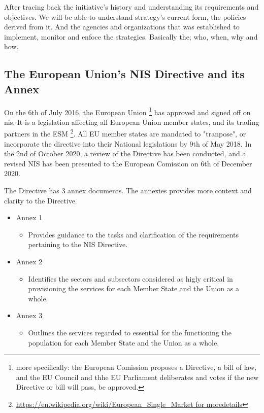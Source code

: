 After tracing back the initiative's history and understanding its requirements and objectives. We will be able to understand strategy's current form, the policies derived from it. And the agencies and organizations that was established to implement, monitor and enfoce the strategies. Basically the; who, when, why and how.

\subsection{The European Union's NIS Directive and its Annex}

On the 6th of July 2016, the European Union \footnote[2]{more specifically: the European Comission proposes a Directive, a bill of law, and the EU Council and thhe EU Parliament deliberates and votes if the new Directive or bill will pass, be approved.} has approved and signed off on \acrfull{nis}. It is a legislation affecting all European Union member states, and its trading partners in the \Gls{ESM} \footnote[2]{\url{https://en.wikipedia.org/wiki/European_Single_Market for moredetails}}. All EU member states are mandated to "tranpose", or incorporate the directive into their National legislations by 9th of May 2018. In the 2nd of October 2020, a review of the Directive has been conducted, and a revised NIS has been presented to the European Comission on 6th of December 2020.

The Directive has 3 annex documents. The annexies provides more context and clarity to the Directive.

\begin{itemize}
    \item Annex 1
        \begin{itemize}
            \item Provides guidance to the tasks and clarification of the requirements pertaining to the NIS Directive.
        \end{itemize}    
    \item Annex 2
        \begin{itemize}
            \item Identifies the sectors and subsectors considered as higly critical in provisioning the services for each Member State and the Union as a whole.
        \end{itemize}
    \item Annex 3
        \begin{itemize}
            \item Outlines the services regarded to essential for the functioning the population for each Member State and the Union as a whole.
        \end{itemize}
\end{itemize}


